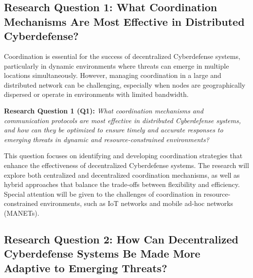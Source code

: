 


\subsection{Research Question 1: What Coordination Mechanisms Are Most Effective in Distributed Cyberdefense?}

Coordination is essential for the success of decentralized Cyberdefense systems, particularly in dynamic environments where threats can emerge in multiple locations simultaneously. However, managing coordination in a large and distributed network can be challenging, especially when nodes are geographically dispersed or operate in environments with limited bandwidth.

\textbf{Research Question 1 (Q1):} \textit{What coordination mechanisms and communication protocols are most effective in distributed Cyberdefense systems, and how can they be optimized to ensure timely and accurate responses to emerging threats in dynamic and resource-constrained environments?}

This question focuses on identifying and developing coordination strategies that enhance the effectiveness of decentralized Cyberdefense systems. The research will explore both centralized and decentralized coordination mechanisms, as well as hybrid approaches that balance the trade-offs between flexibility and efficiency. Special attention will be given to the challenges of coordination in resource-constrained environments, such as IoT networks and mobile ad-hoc networks (MANETs).


\subsection{Research Question 2: How Can Decentralized Cyberdefense Systems Be Made More Adaptive to Emerging Threats?}

